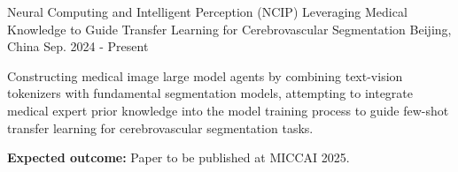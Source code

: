
\newcommand{\expsaddspace}[0]{
  \vspace{5.5mm}
}


\begin{cventries}

  \cventry
  {Neural Computing and Intelligent Perception (NCIP)}
  {Leveraging Medical Knowledge to Guide Transfer Learning for Cerebrovascular Segmentation}
  {Beijing, China}
  {Sep. 2024 - Present}
  {
    \begin{cvitems}
      \item {Constructing medical image large model agents by combining text-vision tokenizers with fundamental segmentation models, attempting to integrate medical expert prior knowledge into the model training process to guide few-shot transfer learning for cerebrovascular segmentation tasks.}
      \item {\textbf{Expected outcome:} Paper to be published at MICCAI 2025.}
    \end{cvitems}
  }
  \expsaddspace


\end{cventries}
